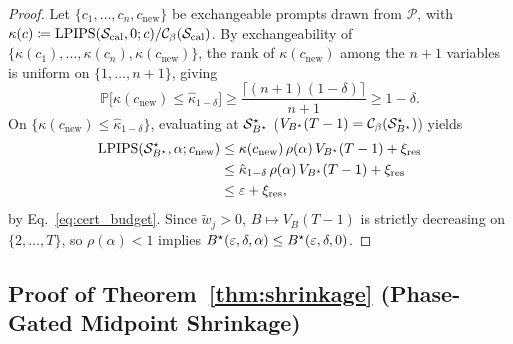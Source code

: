 \begin{proof}
Let $\{c_1, \dots, c_n, c_{\mathrm{new}}\}$ be exchangeable prompts drawn from $\mathcal{P}$, with $\kappa(c) \coloneqq \mathrm{LPIPS}(\mathcal{S}_{\mathrm{cal}}, 0; c) / \mathcal{C}_\beta(\mathcal{S}_{\mathrm{cal}})$. By exchangeability of $\{\kappa(c_1), \dots, \kappa(c_n), \kappa(c_{\mathrm{new}})\}$, the rank of $\kappa(c_{\mathrm{new}})$ among the $n+1$ variables is uniform on $\{1, \dots, n+1\}$, giving
\begin{equation}
\mathbb{P}\bigl[\kappa(c_{\mathrm{new}}) \le \hat{\kappa}_{1-\delta}\bigr] \ge \frac{\lceil (n+1)(1-\delta)\rceil}{n+1} \ge 1 - \delta.
\end{equation}
On $\{\kappa(c_{\mathrm{new}}) \le \hat{\kappa}_{1-\delta}\}$, evaluating at $\mathcal{S}_{B^\star}^\star$ ($V_{B^\star}(T-1) = \mathcal{C}_\beta(\mathcal{S}_{B^\star}^\star)$) yields
\begin{equation}
\begin{aligned}
\mathrm{LPIPS}(\mathcal{S}_{B^\star}^\star, \alpha; c_{\mathrm{new}}) &\le \kappa(c_{\mathrm{new}})\,\rho(\alpha)\,V_{B^\star}(T-1) + \xi_{\mathrm{res}} \\
&\le \hat{\kappa}_{1-\delta}\,\rho(\alpha)\,V_{B^\star}(T-1) + \xi_{\mathrm{res}} \\
&\le \varepsilon + \xi_{\mathrm{res}},
\end{aligned}
\end{equation}
by Eq.~\eqref{eq:cert_budget}. Since $\tilde{w}_j > 0$, $B \mapsto V_B(T-1)$ is strictly decreasing on $\{2, \dots, T\}$, so $\rho(\alpha) < 1$ implies $B^\star(\varepsilon, \delta, \alpha) \le B^\star(\varepsilon, \delta, 0)$.
\end{proof}

\subsection{Proof of Theorem~\ref{thm:shrinkage} (Phase-Gated Midpoint Shrinkage)}
\label{app:proof_thm4}

